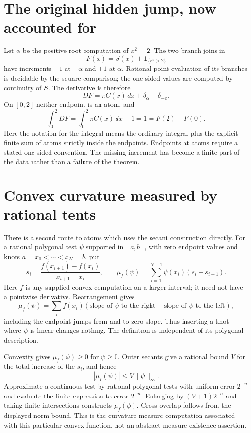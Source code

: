 \section{The original hidden jump, now accounted for}
Let $\alpha$ be the positive root computation of $x^2=2$.  The two branch
joins in
\[
 F(x)=S(x)+\mathbf1_{\{x^2>2\}}
\]
have increments $-1$ at $-\alpha$ and $+1$ at $\alpha$.  Rational point
evaluation of its branches is decidable by the square comparison; the
one-sided values are computed by continuity of $S$.  The derivative is
therefore
\[
 DF=\pi C(x)\,dx+\delta_\alpha-\delta_{-\alpha}.
\]
On $[0,2]$ neither endpoint is an atom, and
\[
 \int_0^2 DF=\int_0^2\pi C(x)\,dx+1=1=F(2)-F(0).
\]
Here the notation for the integral means the ordinary integral plus the
explicit finite sum of atoms strictly inside the endpoints.  Endpoints at
atoms require a stated one-sided convention.  The missing increment has
become a finite part of the data rather than a failure of the theorem.

\section{Convex curvature measured by rational tents}
There is a second route to atoms which uses the secant construction directly.
For a rational polygonal test $\psi$ supported in $[a,b]$, with zero
endpoint values and knots $a=x_0<\cdots<x_N=b$, put
\[
 s_i=\frac{f(x_{i+1})-f(x_i)}{x_{i+1}-x_i},\qquad
 \mu_f(\psi)=\sum_{i=1}^{N-1}\psi(x_i)(s_i-s_{i-1}).
\]
Here $f$ is any supplied convex computation on a larger interval; it need
not have a pointwise derivative.  Rearrangement gives
\[
 \mu_f(\psi)=\sum_i f(x_i)
          (\text{slope of $\psi$ to the right}
           -\text{slope of $\psi$ to the left}),
\]
including the endpoint jumps from and to zero slope.  Thus inserting a knot
where $\psi$ is linear changes nothing.  The definition is independent of
its polygonal description.

Convexity gives $\mu_f(\psi)\ge0$ for $\psi\ge0$.  Outer secants give a
rational bound $V$ for the total increase of the $s_i$, and hence
\[
 |\mu_f(\psi)|\le V\|\psi\|_\infty.
\]
Approximate a continuous test by rational polygonal tests with uniform
error $2^{-n}$ and evaluate the finite expression to error $2^{-n}$.
Enlarging by $(V+1)2^{-n}$ and taking finite intersections constructs
$\mu_f(\phi)$.  Cross-overlap follows from the displayed norm bound.
This is the curvature-measure computation associated with this particular
convex function, not an abstract measure-existence assertion.

